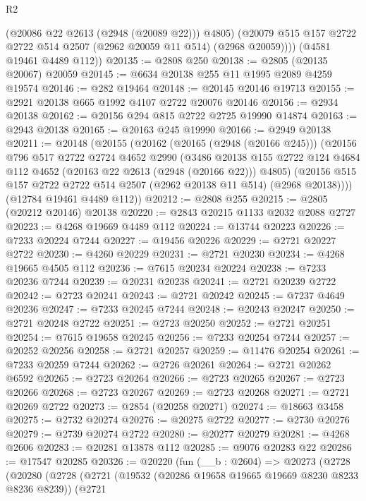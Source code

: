 \begin{lexlean}{R2}
\begin{coremodule}
            (@20086 @22 @2613 (@2948 (@20089 @22)))
            @4805)
          (@20079 @515 @157 @2722 @2722 @514 @2507 (@2962 @20059 @11 @514) (@2968 @20059))))
      (@4581 @19461 @4489 @112))
@20135 := @2808 @250
@20138 := @2805 (@20135 @20067) @20059
@20145 := @6634 @20138 @255 @11 @1995 @2089 @4259 @19574
@20146 := @282 @19464
@20148 := @20145 @20146 @19713
@20155 := @2921 @20138 @665 @1992 @4107 @2722 @20076 @20146
@20156 := @2934 @20138
@20162 := @20156 @294 @815 @2722 @2725 @19990 @14874
@20163 := @2943 @20138
@20165 := @20163 @245 @19990
@20166 := @2949 @20138
@20211 := @20148
    (@20155
      (@20162
        (@20165 (@2948 (@20166 @245)))
        (@20156
          @796
          @517
          @2722
          @2724
          @4652
          @2990
          (@3486
            @20138
            @155
            @2722
            @124
            @4684
            @112
            @4652
            (@20163 @22 @2613 (@2948 (@20166 @22)))
            @4805)
          (@20156 @515 @157 @2722 @2722 @514 @2507 (@2962 @20138 @11 @514) (@2968 @20138))))
      (@12784 @19461 @4489 @112))
@20212 := @2808 @255
@20215 := @2805 (@20212 @20146) @20138
@20220 := @2843 @20215 @1133 @2032 @2088 @2727
@20223 := @4268 @19669 @4489 @112
@20224 := @13744 @20223
@20226 := @7233 @20224 @7244
@20227 := @19456 @20226
@20229 := @2721 @20227 @2722
@20230 := @4260 @20229
@20231 := @2721 @20230
@20234 := @4268 @19665 @4505 @112
@20236 := @7615 @20234 @20224
@20238 := @7233 @20236 @7244
@20239 := @20231 @20238
@20241 := @2721 @20239 @2722
@20242 := @2723 @20241
@20243 := @2721 @20242
@20245 := @7237 @4649 @20236
@20247 := @7233 @20245 @7244
@20248 := @20243 @20247
@20250 := @2721 @20248 @2722
@20251 := @2723 @20250
@20252 := @2721 @20251
@20254 := @7615 @19658 @20245
@20256 := @7233 @20254 @7244
@20257 := @20252 @20256
@20258 := @2721 @20257
@20259 := @11476 @20254
@20261 := @7233 @20259 @7244
@20262 := @2726 @20261
@20264 := @2721 @20262 @6592
@20265 := @2723 @20264
@20266 := @2723 @20265
@20267 := @2723 @20266
@20268 := @2723 @20267
@20269 := @2723 @20268
@20271 := @2721 @20269 @2722
@20273 := @2854 (@20258 @20271)
@20274 := @18663 @3458
@20275 := @2732 @20274
@20276 := @20275 @2722
@20277 := @2730 @20276
@20279 := @2739 @20274 @2722
@20280 := @20277 @20279
@20281 := @4268 @2606
@20283 := @20281 @13878 @112
@20285 := @9076 @20283 @22
@20286 := @17547 @20285
@20326 := @20220
    (fun (__b : @2604) =>
    @20273
      (@2728
        (@20280
          (@2728
            (@2721
              (@19532 (@20286 @19658 @19665 @19669 @8230 @8233 @8236 @8239))
              (@2721

\end{coremodule}
\end{lexlean}
